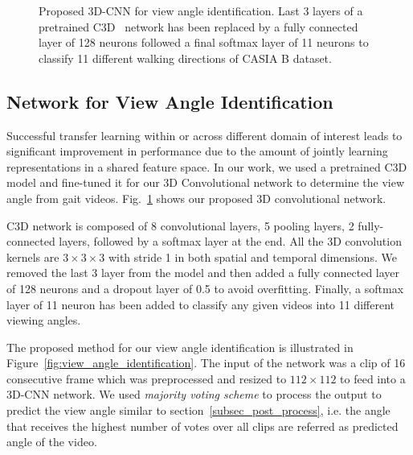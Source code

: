 \begin{figure}[t]
	\caption[Proposed 3D-CNN for video angle identification]
	{Proposed 3D-CNN for view angle identification. Last 3 layers of a pretrained C3D~\cite{Tran_15} network has been replaced by a fully connected layer of 128 neurons followed a final softmax layer of 11 neurons to classify 11 different walking directions of CASIA B dataset. \label{fig:3D_CNN}
	}
\end{figure}

\subsection{Network for View Angle Identification}
Successful transfer learning within or across different domain of interest leads to significant improvement in performance due to the amount of jointly learning representations in a shared feature space. In our work, we used a pretrained C3D model and fine-tuned it for our 3D Convolutional network to determine the view angle from gait videos. Fig.~\ref{fig:3D_CNN} shows our proposed 3D convolutional network. 

C3D network is composed of 8 convolutional layers, 5 pooling layers, 2 fully-connected layers, followed by a softmax layer at the end. All the 3D convolution kernels are $3\times3\times3$ with stride 1 in both spatial and temporal dimensions. We removed the last 3 layer from the model and then added a fully connected layer of 128 neurons and a dropout layer of 0.5 to avoid overfitting. Finally, a softmax layer of 11 neuron has been added to classify any given videos into 11 different viewing angles. 

The proposed method for our view angle identification is illustrated in Figure~\ref{fig:view_angle_identification}. The input of the network was a clip of 16 consecutive frame which was preprocessed and resized to $112\times112$ to feed into a  3D-CNN network. We used {\textit {majority voting scheme}} to process the output to predict the view angle similar to section~\ref{subsec_post_process}, i.e. the angle that receives the highest number of votes over all clips are referred as predicted angle of the video.



